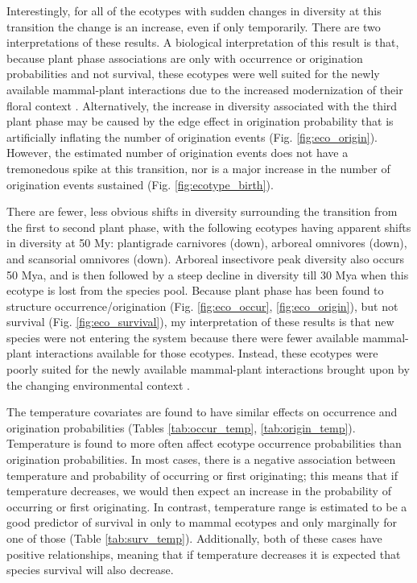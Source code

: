 \documentclass[12pt,letterpaper]{article}
\begin{document}
Interestingly, for all of the ecotypes with sudden changes in diversity at this transition the change is an increase, even if only temporarily. There are two interpretations of these results. A biological interpretation of this result is that, because plant phase associations are only with occurrence or origination probabilities and not survival, these ecotypes were well suited for the newly available mammal-plant interactions due to the increased modernization of their floral context \citep{Graham2011a}. Alternatively, the increase in diversity associated with the third plant phase may be caused by the edge effect in origination probability that is artificially inflating the number of origination events (Fig. \ref{fig:eco_origin}). However, the estimated number of origination events does not have a tremonedous spike at this transition, nor is a major increase in the number of origination events sustained (Fig. \ref{fig:ecotype_birth}).

There are fewer, less obvious shifts in diversity surrounding the transition from the first to second plant phase, with the following ecotypes having apparent shifts in diversity at 50 My: plantigrade carnivores (down), arboreal omnivores (down), and scansorial omnivores (down). Arboreal insectivore peak diversity also occurs 50 Mya, and is then followed by a steep decline in diversity till 30 Mya when this ecotype is lost from the species pool. Because plant phase has been found to structure occurrence/origination (Fig. \ref{fig:eco_occur}, \ref{fig:eco_origin}), but not survival (Fig. \ref{fig:eco_survival}), my interpretation of these results is that new species were not entering the system because there were fewer available mammal-plant interactions available for those ecotypes. Instead, these ecotypes were poorly suited for the newly available mammal-plant interactions brought upon by the changing environmental context \citep{Graham2011a}.

The temperature covariates are found to have similar effects on occurrence and origination probabilities (Tables \ref{tab:occur_temp}, \ref{tab:origin_temp}). Temperature is found to more often affect ecotype occurrence probabilities than origination probabilities. In most cases, there is a negative association between temperature and probability of occurring or first originating; this means that if temperature decreases, we would then expect an increase in the probability of occurring or first originating. In contrast, temperature range is estimated to be a good predictor of survival in only to mammal ecotypes and only marginally for one of those (Table \ref{tab:surv_temp}). Additionally, both of these cases have positive relationships, meaning that if temperature decreases it is expected that species survival will also decrease. 
\end{document}
